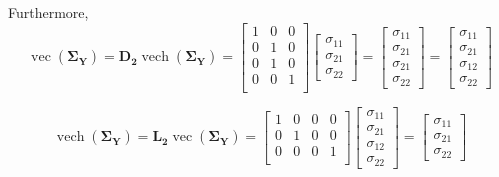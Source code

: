 \documentclass{article}
\begin{document}
Furthermore,
\begin{equation}
\operatorname{vec}(\boldsymbol{\Sigma}_\mathbf{Y})=\mathbf{D_2}\operatorname{vech}(\boldsymbol{\Sigma}_\mathbf{Y})=
\begin{bmatrix}
1 &0 &0 \\
0 &1 &0 \\
0 &1 &0\\
0 &0 &1 \\
\end{bmatrix}
\begin{bmatrix}
\sigma_{11}\\
\sigma_{21} \\
\sigma_{22}
\end{bmatrix}=
\begin{bmatrix}
\sigma_{11}\\
\sigma_{21} \\
\sigma_{21} \\
\sigma_{22}
\end{bmatrix}=
\begin{bmatrix}
\sigma_{11}\\
\sigma_{21} \\
\sigma_{12} \\
\sigma_{22}
\end{bmatrix}
\end{equation}


\begin{equation}   \operatorname{vech}(\boldsymbol{\Sigma}_\mathbf{Y})=\mathbf{L_2}\operatorname{vec}(\boldsymbol{\Sigma}_\mathbf{Y})=
\begin{bmatrix}
1 &0 &0 &0 \\
0 &1 &0  &0\\
0 &0 &0 &1\\
\end{bmatrix}
\begin{bmatrix}
\sigma_{11}\\
\sigma_{21} \\
\sigma_{12} \\
\sigma_{22}
\end{bmatrix}=
\begin{bmatrix}
\sigma_{11}\\
\sigma_{21} \\
\sigma_{22}
\end{bmatrix}
\end{equation}
\end{document}
